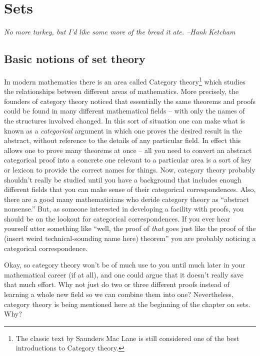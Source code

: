  
\chapter{Sets}

{\em No more turkey, but I'd like some more of the bread it ate. --Hank Ketcham}


\section{Basic notions of set theory}
\label{sec:basic_set_notions}

In modern mathematics there is an area called  
Category theory\footnote{The classic text by Saunders Mac Lane \cite{macl} %
is still considered one of the best introductions to Category theory.} 
which studies the 
relationships between different areas of mathematics.  More precisely,
the founders of category theory noticed that essentially the same theorems 
and proofs could be found in many different mathematical fields -- with
only the names of the structures involved changed.  In this sort of
situation one can make what is known as a \emph{categorical} argument
in which one proves the desired result in the abstract, without reference
to the details of any particular field.  In effect this allows one
to prove many theorems at once -- all you need to convert an abstract
categorical proof into a concrete one relevant to a particular area
is a sort of key or lexicon to provide the correct names for things.
Now, category theory probably shouldn't really be studied until you 
have a background that includes enough different fields that you can
make sense of their categorical correspondences.  Also, there are 
a good many mathematicians who deride category theory as 
``abstract nonsense.''   But, as someone interested in developing a facility
with proofs, you should be on the lookout for categorical correspondences.
If you ever hear yourself utter something like ``well, the proof of 
\emph{that} goes just like the proof of the 
(insert weird technical-sounding name here) theorem'' you are  
probably noticing a categorical correspondence.  

Okay, so category theory won't be of much
use to you until much later in your mathematical career (if at all), and 
one could argue that it doesn't really save that much effort.  Why not just do two or three different 
proofs instead of learning a whole new field so we can combine 
them into one?  Nevertheless, category theory is being
mentioned here at the beginning of the chapter on sets.  Why? 


